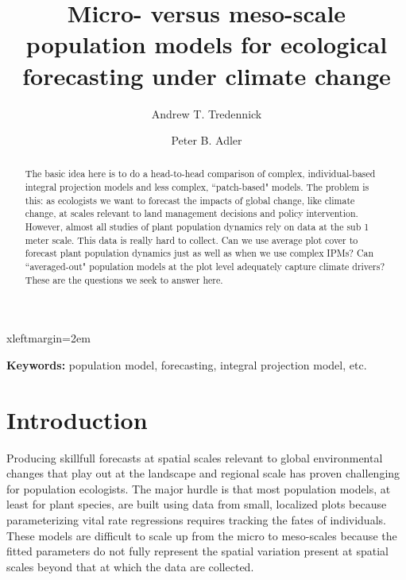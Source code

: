 \documentclass[12pt]{article}
\begin{document}



 {xleftmargin=2em}

\title{\LARGE Micro- versus meso-scale population models for ecological forecasting under climate change}
\author[]{\large Andrew T. Tredennick} 
\author[]{\large Peter B. Adler}
\maketitle

\begin{abstract}
The basic idea here is to do a head-to-head comparison of complex, individual-based integral projection models and less complex, ``patch-based" models. The problem is this: as ecologists we want to forecast the impacts of global change, like climate change, at scales relevant to land management decisions and policy intervention. However, almost all studies of plant population dynamics rely on data at the sub 1 meter scale. This data is really hard to collect. Can we use average plot cover to forecast plant population dynamics just as well as when we use complex IPMs? Can ``averaged-out" population models at the plot level adequately capture climate drivers? These are the questions we seek to answer here.
\end{abstract}

\noindent{}\textbf{Keywords:} population model, forecasting, integral projection model, etc.

\section{Introduction}
Producing skillfull forecasts at spatial scales relevant to global environmental changes that play out at the landscape and regional scale has proven challenging for population ecologists. The major hurdle is that most population models, at least for plant species, are built using data from small, localized plots because parameterizing vital rate regressions requires tracking the fates of individuals. These models are difficult to scale up from the micro to meso-scales because the fitted parameters do not fully represent the spatial variation present at spatial scales beyond that at which the data are collected. 
\end{document}
